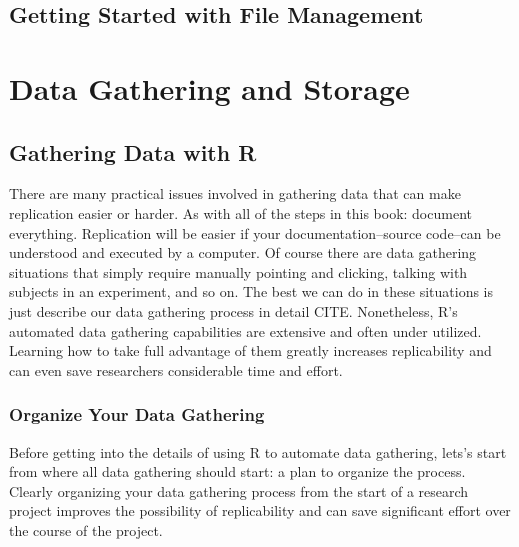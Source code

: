 \documentclass[ChapterTOCs,krantz1]{krantz}\usepackage{graphicx, color}
\begin{document}




\chapter{Getting Started with File Management}\label{DirectoriesChapter}




\part{Data Gathering and Storage}





\chapter{Gathering Data with R}\label{DataGather}

There are many practical issues involved in gathering data that can make replication easier or harder. As with all of the steps in this book: document everything. Replication will be easier if your documentation--source code--can be understood and executed by a computer. Of course there are data gathering situations that simply require manually pointing and clicking, talking with subjects in an experiment, and so on. The best we can do in these situations is just describe our data gathering process in detail CITE. Nonetheless, R's automated data gathering capabilities are extensive and often under utilized. Learning how to take full advantage of them greatly increases replicability and can even save researchers considerable time and effort.

\section{Organize Your Data Gathering}

Before getting into the details of using R to automate data gathering, lets's start from where all data gathering should start: a plan to organize the process. Clearly organizing your data gathering process from the start of a research project improves the possibility of replicability and can save significant effort over the course of the project. 
\end{document}
